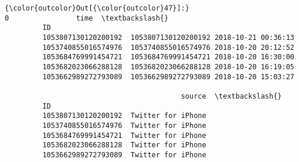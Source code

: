 \documentclass[11pt]{article}
\begin{document}
\begin{Verbatim}[commandchars=\\\{\}]
{\color{outcolor}Out[{\color{outcolor}47}]:}                                        0                time  \textbackslash{}
         ID                                                             
         1053807130120200192  1053807130120200192 2018-10-21 00:36:13   
         1053740855016574976  1053740855016574976 2018-10-20 20:12:52   
         1053684769991454721  1053684769991454721 2018-10-20 16:30:00   
         1053682023066288128  1053682023066288128 2018-10-20 16:19:05   
         1053662989272793089  1053662989272793089 2018-10-20 15:03:27   
         
                                          source  \textbackslash{}
         ID                                        
         1053807130120200192  Twitter for iPhone   
         1053740855016574976  Twitter for iPhone   
         1053684769991454721  Twitter for iPhone   
         1053682023066288128  Twitter for iPhone   
         1053662989272793089  Twitter for iPhone   
         

\end{Verbatim}
\end{document}
